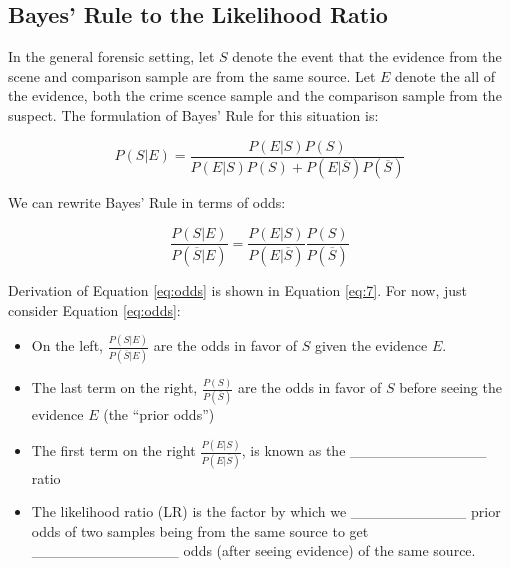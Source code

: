 \documentclass[]{book}
\providecommand{\tightlist}{%
  \setlength{\itemsep}{0pt}\setlength{\parskip}{0pt}}
\theoremstyle{definition}
\theoremstyle{definition}
\theoremstyle{remark}
\begin{document}
\subsection{Bayes' Rule to the Likelihood
Ratio}\label{bayes-rule-to-the-likelihood-ratio}

In the general forensic setting, let \(S\) denote the event that the
evidence from the scene and comparison sample are from the same source.
Let \(E\) denote the all of the evidence, both the crime scence sample
and the comparison sample from the suspect. The formulation of Bayes'
Rule for this situation is:

\[ P(S|E) = \frac{P(E|S)P(S)}{P(E|S)P(S) + P(E|\overline{S})P(\overline{S})}\]

We can rewrite Bayes' Rule in terms of odds:

\begin{equation}\label{eq:odds}
\frac{P(S|E)}{P(\overline{S}|E)} = \frac{P(E|S)}{P(E|\overline{S})}\frac{P(S)}{P(\overline{S})}
\end{equation}

Derivation of Equation \ref{eq:odds} is shown in Equation \ref{eq:7}.
For now, just consider Equation \ref{eq:odds}:

\begin{itemize}
\tightlist
\item
  On the left, \(\frac{P(S|E)}{P(\overline{S}|E)}\) are the odds in
  favor of \(S\) given the evidence \(E\).
\item
  The last term on the right, \(\frac{P(S)}{P(\overline{S})}\) are the
  odds in favor of \(S\) before seeing the evidence \(E\) (the ``prior
  odds'') \vspace{.1in}
\item
  The first term on the right \(\frac{P(E|S)}{P(E|\overline{S})}\), is
  known as the \_\_\_\_\_\_\_\_\_\_\_\_\_ ratio \vspace{.1in}
\item
  The likelihood ratio (LR) is the factor by which we
  \_\_\_\_\_\_\_\_\_\_\_ prior odds of two samples being from the same
  source to get \_\_\_\_\_\_\_\_\_\_\_\_\_\_ odds (after seeing
  evidence) of the same source.
\end{itemize}
\end{document}
